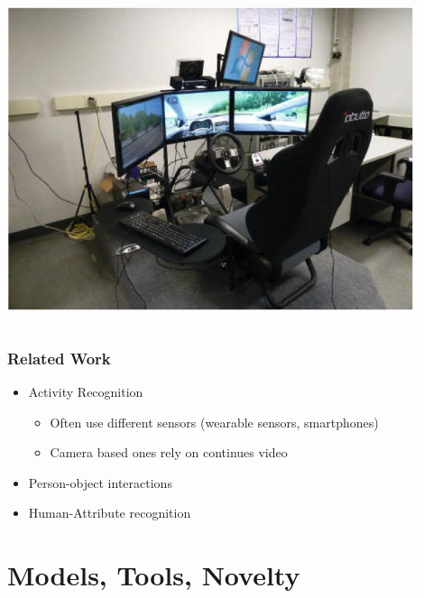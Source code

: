 \documentclass{beamer}
\begin{document}
\begin{frame}
\begin{columns}
\begin{column}{0.25\textwidth}
\begin{center}
					\includegraphics[width=0.9\textwidth]{RanForSim}
				\end{center}
			\end{column}
		\end{columns}
		
	\end{frame}
	
	\begin{frame}
		\frametitle{Related Work}
		
		\begin{itemize}
				\item Activity Recognition
					\begin{itemize}
						\item Often use different sensors (wearable sensors, smartphones) \cite{6258525} \cite{6365160}
						\item Camera based ones rely on continues video \cite{1315249} \cite{1430826}

	
					\end{itemize}		
					\item Person-object interactions 	\cite{NIPS2011_0858}
					\item Human-Attribute recognition 	\cite{6957817}
				\end{itemize}
		
	\end{frame}
	
	
	\section{Models, Tools, Novelty}	
\end{document}
